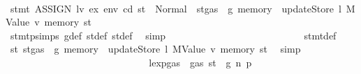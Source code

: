 \begin{isabellebody}
\ \ \ \ \ \ \ \ \ \ \ \ \ \ \ \ \ \ \ \ \ \ \ \ \ \ \isamarkupfalse%
\ {\isachardoublequoteopen}stmt\ {\isacharparenleft}{\kern0pt}ASSIGN\ lv\ ex{\isacharparenright}{\kern0pt}\ env\ cd\ st\ {\isacharequal}{\kern0pt}\ Normal\ {\isacharparenleft}{\kern0pt}{\isacharparenleft}{\kern0pt}{\isacharparenright}{\kern0pt}{\isacharcomma}{\kern0pt}\ st{\isacharprime}{\kern0pt}{\isacharprime}{\kern0pt}{\isasymlparr}gas\ {\isacharcolon}{\kern0pt}{\isacharequal}{\kern0pt}\ g{\isacharprime}{\kern0pt}{\isacharprime}{\kern0pt}{\isacharcomma}{\kern0pt}\ memory\ {\isacharcolon}{\kern0pt}{\isacharequal}{\kern0pt}\ updateStore\ l\ {\isacharparenleft}{\kern0pt}MValue\ v{\isacharprime}{\kern0pt}{\isacharparenright}{\kern0pt}\ {\isacharparenleft}{\kern0pt}memory\ st{\isacharprime}{\kern0pt}{\isacharprime}{\kern0pt}{\isacharparenright}{\kern0pt}{\isasymrparr}{\isacharparenright}{\kern0pt}{\isachardoublequoteclose}\isanewline
\ \ \ \ \ \ \ \ \ \ \ \ \ \ \ \ \ \ \ \ \ \ \ \ \ \ \ \ \isamarkupfalse%
\ stmt{\isachardot}{\kern0pt}psimps{\isacharparenleft}{\kern0pt}{}{\isacharparenright}{\kern0pt}\ g{\isacharunderscore}{\kern0pt}def\ st{\isacharprime}{\kern0pt}{\isacharunderscore}{\kern0pt}def\ st{\isacharprime}{\kern0pt}{\isacharprime}{\kern0pt}{\isacharunderscore}{\kern0pt}def\ \isamarkupfalse%
\ simp\isanewline
\ \ \ \ \ \ \ \ \ \ \ \ \ \ \ \ \ \ \ \ \ \ \ \ \ \ \isamarkupfalse%
\ stmt{\isacharunderscore}{\kern0pt}def\ \isamarkupfalse%
\ {\isachardoublequoteopen}st{}{\isacharprime}{\kern0pt}{\isacharequal}{\kern0pt}\ {\isacharparenleft}{\kern0pt}st{\isacharprime}{\kern0pt}{\isacharprime}{\kern0pt}{\isasymlparr}gas\ {\isacharcolon}{\kern0pt}{\isacharequal}{\kern0pt}\ g{\isacharprime}{\kern0pt}{\isacharprime}{\kern0pt}{\isacharcomma}{\kern0pt}\ memory\ {\isacharcolon}{\kern0pt}{\isacharequal}{\kern0pt}\ updateStore\ l\ {\isacharparenleft}{\kern0pt}MValue\ v{\isacharprime}{\kern0pt}{\isacharparenright}{\kern0pt}\ {\isacharparenleft}{\kern0pt}memory\ st{\isacharprime}{\kern0pt}{\isacharprime}{\kern0pt}{\isacharparenright}{\kern0pt}{\isasymrparr}{\isacharparenright}{\kern0pt}{\isachardoublequoteclose}\ \isamarkupfalse%
\ simp\isanewline
\ \ \ \ \ \ \ \ \ \ \ \ \ \ \ \ \ \ \ \ \ \ \ \ \ \ \isamarkupfalse%
\ \isamarkupfalse%
\ lexp{\isacharunderscore}{\kern0pt}gas\ {\isacharbackquoteopen}{\isasymnot}\ gas\ st\ {\isasymle}\ g{\isacharbackquoteclose}\ n{}\ p{}\ \isamarkupfalse%

\end{isabellebody}
